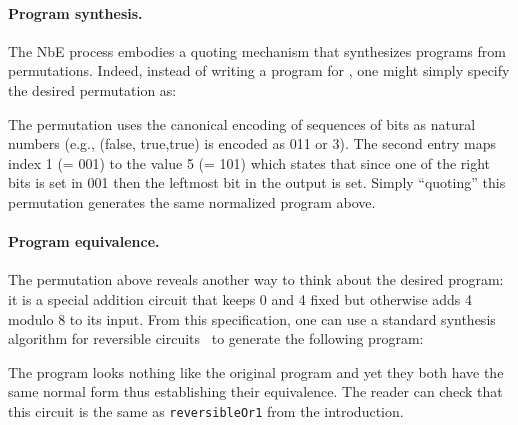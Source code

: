 \paragraph*{Program synthesis.} The NbE process embodies a quoting mechanism that synthesizes programs from
permutations. Indeed, instead of writing a program for , one might simply specify the desired permutation as:

\resetperm{}

\noindent The permutation uses the canonical encoding of sequences of bits as natural numbers (e.g., (\textsf{false},
\textsf{true},\textsf{true}) is encoded as 011 or 3).  The second entry maps index 1 (= 001) to the value 5 (= 101)
which states that since one of the right bits is set in 001 then the leftmost bit in the output is set. Simply
``quoting'' this permutation generates the same normalized program  above.

\paragraph*{Program equivalence.} The permutation above reveals another way to think about the desired program: it is a
special addition circuit that keeps 0 and 4 fixed but otherwise adds 4 modulo 8 to its input. From this specification,
one can use a standard synthesis algorithm for reversible circuits~\cite{10.1145/775832.775915} to generate the
following program:

\adder{}

\noindent The  program looks nothing like the original  program and yet they both have the
same normal form thus establishing their equivalence. The reader can check that this circuit is the same as
\verb|reversibleOr1| from the introduction.



